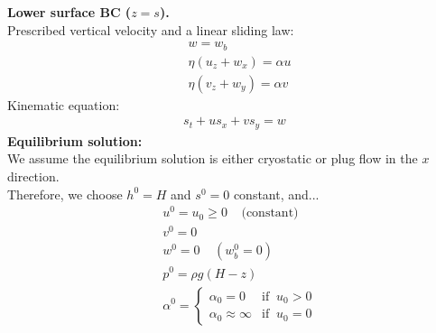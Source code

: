 \documentclass[paper=a4, fontsize=11pt]{article}
\begin{document}
\noindent\textbf{Lower surface BC ($z=s$).}\\
Prescribed vertical velocity and a linear sliding law:
\begin{align}
&w  = w_b\\
&\eta(u_z + w_x) = \alpha u \\
&\eta(v_z + w_y) = \alpha v
\end{align}
\noindent Kinematic equation:
\begin{align}
s_t + us_x + vs_y  = w
\end{align}
\noindent\textbf{Equilibrium solution:}\\
We assume the equilibrium solution is either cryostatic or plug flow in the $x$ direction.\\
Therefore, we choose $h^0=H$ and $s^0=0$ constant, and...
\begin{align}
&u^0 = u_0\geq 0\;\;\;\; \text{(constant)} \\
& v^0 = 0 \\
&w^0 = 0 \;\;\;\; (w_b^0=0)\\
&p^0 = \rho g (H-z) \\
&\alpha^0  = \begin{cases}
\alpha_0 = 0 & \text{if} \;\; u_0>0 \\
\alpha_0 \approx \infty & \text{if} \;\; u_0 =0
\end{cases}
\end{align}
\end{document}
